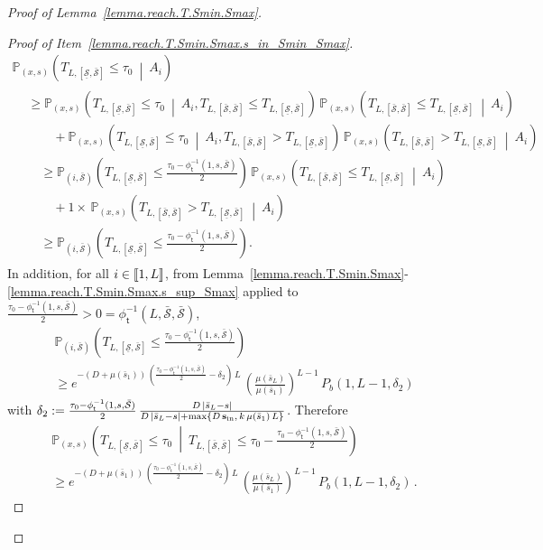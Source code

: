 \documentclass[AHL,Unicode,longabstracts,published]{cedram}
\newcommand{\llbracket}{\mathopen{[\mkern -2.7mu[}}
\newcommand{\rrbracket}{\mathclose{]\mkern -2.7mu]}}
\newcommand{\PP}{\mathbb{P}}
\newcommand{\Sin}{{\mathbf s}_{\textrm{\tiny\rm in}}}
\newcommand{\Smin}{\underline{\mathcal{S}}}
\newcommand{\Smax}{\bar{\mathcal{S}}}
\newcommand{\barmu}{\mu(\bar s_1)}
\newcommand{\phit}{\phi_\textsf{t}^{-1}}
\newcommand{\1}{\mathbf{1}}
\begin{document}
\begin{proof}[Proof of Lemma~\ref{lemma.reach.T.Smin.Smax}]
\begin{proof}[{Proof of Item~\eqref{lemma.reach.T.Smin.Smax.s_in_Smin_Smax}}]
\begin{multline*}
\PP_{(x,s)}
\left(T_{L,[\Smin,\Smax]}\leq\tau_0 \ \middle| \ A_i \right)\\
\begin{aligned}
&\geq
\PP_{(x,s)}
\left(T_{L,\left[\Smin,\Smax\right]}\leq\tau_0 \ \middle| \ A_i, T_{L,\left[\Smax,\Smax\right]}\leq T_{L,\left[\Smin,\Smax\right]}\right)\,
\PP_{(x,s)}\left(T_{L,\left[\Smax,\Smax\right]}\leq T_{L,\left[\Smin,\Smax\right]} \ \middle| \ A_i \right)
\\
&\qquad +
\PP_{(x,s)}
\left(T_{L,\left[\Smin,\Smax\right]}\leq\tau_0 \ \middle| \ A_i, T_{L,\left[\Smax,\Smax\right]}> T_{L,\left[\Smin,\Smax\right]} \right)\,
\PP_{(x,s)}\left(T_{L,\left[\Smax,\Smax\right]}> T_{L,\left[\Smin,\Smax\right]} \ \middle| \ A_i \right)
\\
&\quad\geq
\PP_{(i,\Smax)}
\left(T_{L,\left[\Smin,\Smax\right]}\leq \frac{\tau_0-\phit\left(1, s,\Smax\right)}{2}\right)\,
\PP_{(x,s)}\left(T_{L,\left[\Smax,\Smax\right]}\leq T_{L,[\Smin,\Smax]} \ \middle| \ A_i \right)
\\
&\qquad + 1\times\,
\PP_{(x,s)}\left(T_{L,\left[\Smax,\Smax\right]}> T_{L,\left[\Smin,\Smax\right]} \ \middle| \ A_i \right)
\\
&\quad\geq
\PP_{(i,\Smax)}
\left(T_{L,\left[\Smin,\Smax\right]}\leq \frac{\tau_0-\phit\left(1, s,\Smax\right)}{2}\right).
\end{aligned}
\end{multline*}
In addition, for all $i \in \llbracket 1, L \rrbracket$, from Lemma~\ref{lemma.reach.T.Smin.Smax}-\ref{lemma.reach.T.Smin.Smax.s_sup_Smax} applied to $\frac{\tau_0-\phit(1, s,\Smax)}{2}>0=\phit(L,\Smax,\Smax)$,
\begin{multline*}
\PP_{(i,\Smax)}\left(T_{L,\left[\Smin,\Smax\right]}\leq \frac{\tau_0-\phit\left(1, s,\Smax\right)}{2}\right)\\
\geq e^{-(D+\barmu)\,\left(\frac{\tau_0-\phit\left(1, s,\Smax\right)}{2}-\delta_2\right)\,L}\,
\left(\frac{\mu(\bar s_L)}{\barmu}\right)^{L-1}\,P_b(1,L-1, \delta_2)
\end{multline*}
with $\delta_2:=\frac{\tau_0-\phit(1, s,\Smax)}{2}\,\frac{D\,|\bar s_L-s|}{D\,|\bar s_L-s|+\max\{D\,\Sin,\,k\,\barmu\,L\}}$. Therefore
\begin{multline}\label{lemma.reachS.integrand}
\PP_{(x,s)}\left(T_{L,[\Smin,\Smax]}\leq\tau_0\ \middle| \ T_{L,[\Smax,\Smax]}\leq \tau_0-\frac{\tau_0-\phit\left(1, s,\Smax\right)}{2} \right)
\\
\geq e^{-(D+\barmu)\,\left(\frac{\tau_0-\phit\left(1, s,\Smax\right)}{2}-\delta_2\right)\,L}\,
\left(\frac{\mu(\bar s_L)}{\barmu}\right)^{L-1}\,P_b(1,L-1, \delta_2)\,.
\end{multline}


\end{proof}
\end{proof}
\end{document}

